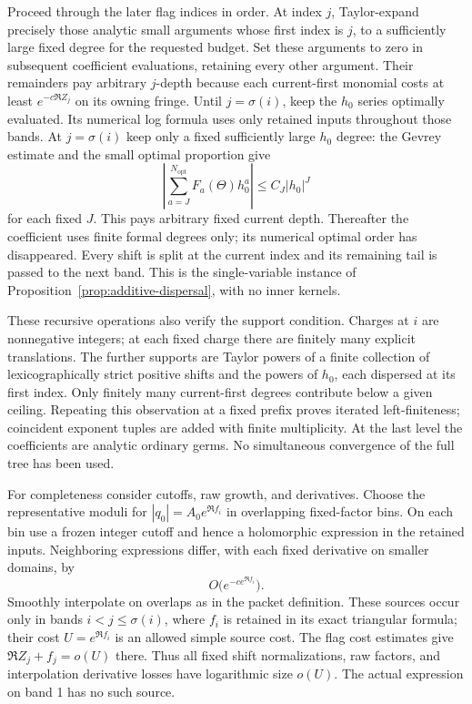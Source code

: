 Proceed through the later flag indices in order.  At index $j$,
Taylor-expand precisely those analytic small arguments whose first
index is $j$, to a sufficiently large fixed degree for the requested
budget.  Set these arguments to zero in subsequent coefficient
evaluations, retaining every other argument.  Their remainders pay
arbitrary $j$-depth because each current-first monomial costs at
least $e^{-c\Re Z_j}$ on its owning fringe.  Until $j=\sigma(i)$,
keep the $h_0$ series optimally evaluated.  Its numerical log formula
uses only retained inputs throughout those bands.  At
$j=\sigma(i)$ keep only a fixed sufficiently large $h_0$ degree:
the Gevrey estimate and the small optimal proportion give
\[
 \left|\sum_{a=J}^{N_{\mathrm{opt}}}F_a(\Theta)h_0^a\right|
       \le C_J|h_0|^J
\]
for each fixed $J$.  This pays arbitrary fixed current depth.
Thereafter the coefficient uses finite formal degrees only; its
numerical optimal order has disappeared.  Every shift is split at
the current index and its remaining tail is passed to the next
band.  This is the single-variable instance of
Proposition~\ref{prop:additive-dispersal}, with no inner kernels.

These recursive operations also verify the support condition.
Charges at $i$ are nonnegative integers; at each fixed charge there
are finitely many explicit translations.  The further supports are
Taylor powers of a finite collection of lexicographically strict
positive shifts and the powers of $h_0$, each dispersed at its
first index.  Only finitely many current-first degrees contribute
below a given ceiling.  Repeating this observation at a fixed
prefix proves iterated left-finiteness; coincident exponent tuples
are added with finite multiplicity.  At the last level the
coefficients are analytic ordinary germs.  No simultaneous
convergence of the full tree has been used.

For completeness consider cutoffs, raw growth, and derivatives.
Choose the representative moduli for $|q_0|=A_0e^{\Re f_i}$ in
overlapping fixed-factor bins.  On each bin use a frozen integer
cutoff and hence a holomorphic expression in the retained inputs.
Neighboring expressions differ, with each fixed derivative on
smaller domains, by
\begin{equation}\label{eq:regular-cutoff-cost}
 O\bigl(e^{-c e^{\Re f_i}}\bigr).
\end{equation}
Smoothly interpolate on overlaps as in the packet definition.
These sources occur only in bands
$i<j\le\sigma(i)$, where $f_i$ is retained in its exact
triangular formula; their cost $U=e^{\Re f_i}$ is an allowed
simple source cost.  The flag cost estimates give
$\Re Z_j+f_j=o(U)$ there.  Thus all fixed shift normalizations,
raw factors, and interpolation derivative losses have logarithmic
size $o(U)$.  The actual expression on band 1 has no such source.

